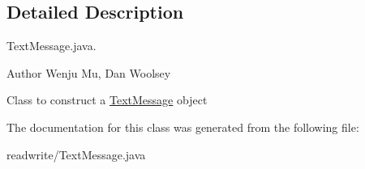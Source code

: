 \subsection{Detailed Description}
Text\+Message.\+java. 

\begin{DoxyAuthor}{Author}
Wenju Mu, Dan Woolsey
\end{DoxyAuthor}
Class to construct a \hyperlink{class_text_message}{Text\+Message} object 

The documentation for this class was generated from the following file\+:\begin{DoxyCompactItemize}
\item 
readwrite/Text\+Message.\+java\end{DoxyCompactItemize}
